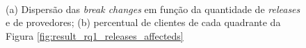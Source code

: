 \begin {figure} [h!]
   \centering
   \mbox {
        \quad
    }
    \caption{(a) Dispersão das \textit{break changes} em função da quantidade de \textit{releases} e de provedores; (b) percentual de clientes de cada quadrante da Figura \ref{fig:result_rq1_releases_affecteds}}
    \label{fig:result_rq1_once_twice_three}
\end{figure}

